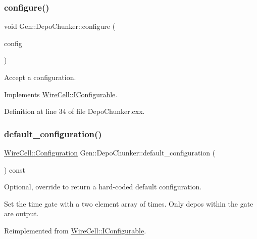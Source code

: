 \subsubsection{\texorpdfstring{configure()}{configure()}}
{\footnotesize\ttfamily void Gen\+::\+Depo\+Chunker\+::configure (\begin{DoxyParamCaption}\item[{const \hyperlink{namespace_wire_cell_a9f705541fc1d46c608b3d32c182333ee}{Wire\+Cell\+::\+Configuration} \&}]{config }\end{DoxyParamCaption})\hspace{0.3cm}{\ttfamily [virtual]}}



Accept a configuration. 



Implements \hyperlink{class_wire_cell_1_1_i_configurable_a57ff687923a724093df3de59c6ff237d}{Wire\+Cell\+::\+I\+Configurable}.



Definition at line 34 of file Depo\+Chunker.\+cxx.

\mbox{\label{class_wire_cell_1_1_gen_1_1_depo_chunker_ac865314ea60a3cb9e72237e4cee6ce51}} 
\subsubsection{\texorpdfstring{default\+\_\+configuration()}{default\_configuration()}}
{\footnotesize\ttfamily \hyperlink{namespace_wire_cell_a9f705541fc1d46c608b3d32c182333ee}{Wire\+Cell\+::\+Configuration} Gen\+::\+Depo\+Chunker\+::default\+\_\+configuration (\begin{DoxyParamCaption}{ }\end{DoxyParamCaption}) const\hspace{0.3cm}{\ttfamily [virtual]}}



Optional, override to return a hard-\/coded default configuration. 

Set the time gate with a two element array of times. Only depos within the gate are output. 

Reimplemented from \hyperlink{class_wire_cell_1_1_i_configurable_a54841b2da3d1ea02189478bff96f7998}{Wire\+Cell\+::\+I\+Configurable}.



